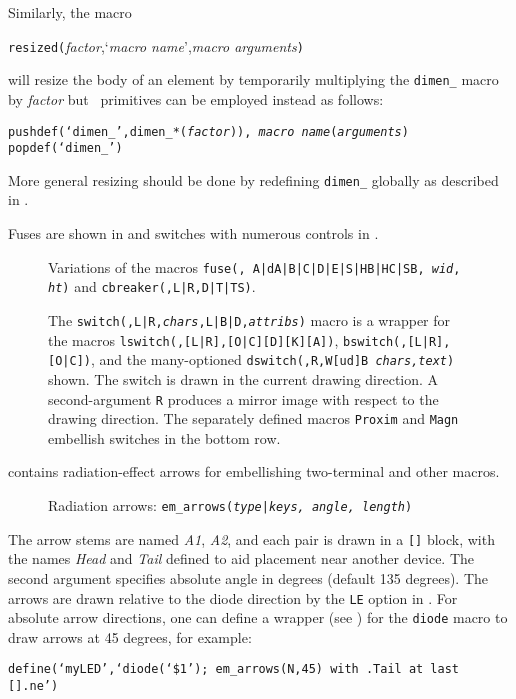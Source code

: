 Similarly, the macro
\par
{\tt resized(}{\sl factor},`{\sl macro name}',{\sl macro arguments}{\tt )}
\par
\noindent
will resize the body of an element by temporarily multiplying
the {\tt dimen\_} macro by {\sl factor} but
\Mfour\ primitives can be employed instead as follows:
\par
{\tt pushdef(`dimen\_',dimen\_*({\sl factor})),%
{\sl macro name}({\sl arguments}) popdef(`dimen\_')}
\par
\noindent
More general resizing should be
done by redefining {\tt dimen\_} globally as described in .

Fuses are shown in 
and switches with numerous controls in .
\begin{figure}[h!t]
   
   \caption{Variations of the macros
     {\tt fuse(\linespec, A|dA|B|C|D|E|S|HB|HC|SB, {\sl wid}, {\sl ht})}
     and {\tt cbreaker(\linespec,L|R,D|T|TS)}.}
   \label{Fuses}
   \end{figure}

\begin{figure}[h!t]
   
   \caption{The
     {\tt switch(\linespec,L|R,{\sl chars},L|B|D,{\sl attribs})}
     macro is a wrapper for the macros 
     {\tt lswitch(\linespec,[L|R],[O|C][D][K][A])},
     {\tt bswitch(\linespec,[L|R],[O|C])},
     and the many-optioned
     {\tt dswitch(\linespec,R,W[ud]B {\sl chars,text})} shown.
     The switch is drawn in the current drawing direction.
     A second-argument {\tt R} produces a mirror
     image with respect to the drawing direction.
     The separately defined macros {\tt Proxim} and {\tt Magn}
     embellish switches in the bottom row.}
   \label{Switches}
   \end{figure}

\pagebreak
{} contains radiation-effect arrows for embellishing two-terminal
and other macros.
\begin{figure}[h!t]
   
   \caption{Radiation arrows: {\tt em\_arrows({\sl type}|{\sl keys,%
     angle, length})}}
   \label{Emarrows}
   \end{figure}
The arrow stems are named {\sl A1}, {\sl A2},
and each pair is drawn in a \verb|[]| block, with
the names {\sl Head} and {\sl Tail} defined to
aid placement near another device.  The second argument specifies
absolute angle in degrees (default 135 degrees).
The arrows are drawn relative to the diode direction by the {\tt LE}
option in .  For absolute arrow directions, one can
define a wrapper (see ) for the {\tt diode} macro to draw arrows
at 45 degrees, for example:
\par
{\tt define(`myLED',`diode(`\$1'); em\_arrows(N,45)
 with .Tail at last [].ne')}

